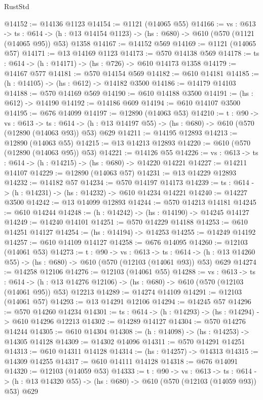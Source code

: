 \begin{lexlean}{RustStd}
\begin{coremodule}
@14152 := @14136 @1123
@14154 := @1121 (@14065 @55)
@14166 := {vs : @613} ->
  {ts : @614} -> (h : @13 @14154 @1123) -> (hs : @680) -> @610 (@570 (@1121 (@14065 @95)) @53) @1358
@14167 := @14152 @569
@14169 := @1121 (@14065 @57)
@14171 := @13 @14169 @1123
@14173 := @570 @14138 @569
@14178 := {ts : @614} -> (h : @14171) -> (hs : @726) -> @610 @14173 @1358
@14179 := @14167 @577
@14181 := @570 @14154 @569
@14182 := @610 @14181
@14185 := (h : @14105) -> (hs : @612) -> @14182 @3500
@14186 := @14179 @14103
@14188 := @570 @14169 @569
@14190 := @610 @14188 @3500
@14191 := (hs : @612) -> @14190
@14192 := @14186 @609
@14194 := @610 @14107 @3500
@14195 := @676 @14099
@14197 := @12890 (@14063 @53)
@14210 := {t : @90} ->
  {vs : @613} ->
  {ts : @614} -> (h : @13 @14197 @55) -> (hs : @680) -> @610 (@570 (@12890 (@14063 @93)) @53) @629
@14211 := @14195 @12893
@14213 := @12890 (@14063 @55)
@14215 := @13 @14213 @12893
@14220 := @610 (@570 (@12890 (@14063 @95)) @53)
@14221 := @14126 @55
@14226 := {vs : @613} -> {ts : @614} -> (h : @14215) -> (hs : @680) -> @14220 @14221
@14227 := @14211 @14107
@14229 := @12890 (@14063 @57)
@14231 := @13 @14229 @12893
@14232 := @14182 @57
@14234 := @570 @14197 @14173
@14239 := {ts : @614} -> (h : @14231) -> (hs : @14232) -> @610 @14234 @14221
@14240 := @14227 @3500
@14242 := @13 @14099 @12893
@14244 := @570 @14213 @14181
@14245 := @610 @14244
@14248 := (h : @14242) -> (hs : @14190) -> @14245 @14127
@14249 := @14240 @14101
@14251 := @570 @14229 @14188
@14253 := @610 @14251 @14127
@14254 := (hs : @14194) -> @14253
@14255 := @14249 @14192
@14257 := @610 @14109 @14127
@14258 := @676 @14095
@14260 := @12103 (@14061 @53)
@14273 := {t : @90} ->
  {vs : @613} ->
  {ts : @614} -> (h : @13 @14260 @55) -> (hs : @680) -> @610 (@570 (@12103 (@14061 @93)) @53) @629
@14274 := @14258 @12106
@14276 := @12103 (@14061 @55)
@14288 := {vs : @613} ->
  {ts : @614} ->
  (h : @13 @14276 @12106) -> (hs : @680) -> @610 (@570 (@12103 (@14061 @95)) @53) @12213
@14289 := @14274 @14109
@14291 := @12103 (@14061 @57)
@14293 := @13 @14291 @12106
@14294 := @14245 @57
@14296 := @570 @14260 @14234
@14301 := {ts : @614} -> (h : @14293) -> (hs : @14294) -> @610 @14296 @12213
@14302 := @14289 @14127
@14304 := @570 @14276 @14244
@14305 := @610 @14304
@14308 := (h : @14098) -> (hs : @14253) -> @14305 @14128
@14309 := @14302 @14096
@14311 := @570 @14291 @14251
@14313 := @610 @14311 @14128
@14314 := (hs : @14257) -> @14313
@14315 := @14309 @14255
@14317 := @610 @14111 @14128
@14318 := @676 @14091
@14320 := @12103 (@14059 @53)
@14333 := {t : @90} ->
  {vs : @613} ->
  {ts : @614} -> (h : @13 @14320 @55) -> (hs : @680) -> @610 (@570 (@12103 (@14059 @93)) @53) @629

\end{coremodule}
\end{lexlean}
